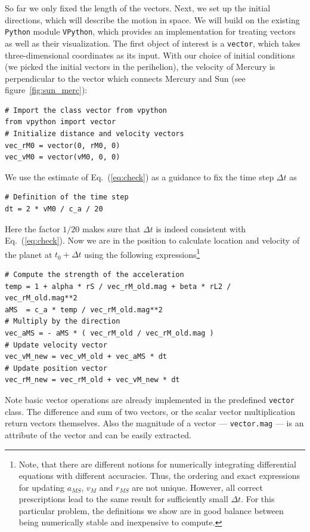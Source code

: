 \documentclass[12pt,ngerman,american]{iopart}
\newcommand{\python}[0]{\texttt{Python}}
\newcommand{\vpython}[0]{\texttt{VPython}}
\newcommand{\code}[1]{{\scriptsize\colorbox{light-gray}{\texttt{#1}}}}
\begin{document}
So far we only fixed the length of the vectors. Next, we set up the initial directions, which will describe the motion in space.
We will build on the existing \python{} module \vpython{}, which provides an implementation for treating vectors as well as their visualization.
The first object of interest is a \texttt{vector}, which takes three-dimensional coordinates as its input.
With our choice of initial conditions (we picked the initial vectors in the perihelion), the velocity of Mercury is perpendicular to the vector which connects Mercury and Sun (see figure~\ref{fig:sun_merc}):
\begin{lstlisting}
# Import the class vector from vpython
from vpython import vector
# Initialize distance and velocity vectors
vec_rM0 = vector(0, rM0, 0)
vec_vM0 = vector(vM0, 0, 0)
\end{lstlisting}
We use the estimate of Eq.~(\ref{eq:check}) as a guidance to fix the time step $\Delta t$ as
\begin{lstlisting}
# Definition of the time step
dt = 2 * vM0 / c_a / 20
\end{lstlisting}
Here the factor $1/20$ makes sure that $\Delta t$ is indeed consistent with Eq.~(\ref{eq:check}).
Now we are in the position to calculate location and velocity of the planet at $t_0+\Delta t$ using the following expressions\footnote{%
	Note, that there are different notions for numerically integrating differential equations with different accuracies.
	Thus, the ordering and exact expressions for updating $a_{MS}$, $v_M$ and $r_{MS}$ are not unique. However, all correct prescriptions lead to the same result for sufficiently small $\Delta t$.
	For this particular problem, the definitions we show are in good balance between being numerically stable and inexpensive to compute.
}%
\begin{lstlisting}
# Compute the strength of the acceleration
temp = 1 + alpha * rS / vec_rM_old.mag + beta * rL2 / vec_rM_old.mag**2
aMS  = c_a * temp / vec_rM_old.mag**2
# Multiply by the direction
vec_aMS = - aMS * ( vec_rM_old / vec_rM_old.mag )
# Update velocity vector
vec_vM_new = vec_vM_old + vec_aMS * dt
# Update position vector
vec_rM_new = vec_rM_old + vec_vM_new * dt
\end{lstlisting}
Note basic vector operations are already implemented in the predefined \texttt{vector} class.
The difference and sum of two vectors, or the scalar vector multiplication return vectors themselves.
Also the magnitude of a vector --- \code{vector.mag} --- is an attribute of the vector and can be easily extracted.
\end{document}
